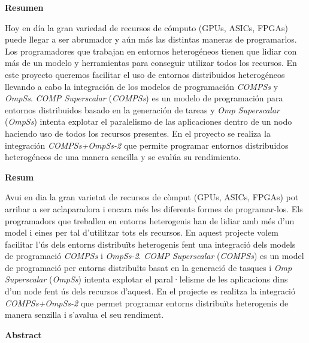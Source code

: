 \afterpage{\blankpage}
\newpage

\noindent
\thispagestyle{plain}
\begin{center}
	\huge{\textbf{Resumen}}
\end{center}

Hoy en día la gran variedad de recursos de cómputo (GPUs, ASICs, FPGAs) puede llegar a ser abrumador y aún más las distintas maneras de programarlos. 
Los programadores que trabajan en entornos heterogéneos tienen que lidiar con más de un modelo y herramientas para conseguir utilizar todos los recursos.
En este proyecto queremos facilitar el uso de entornos distribuidos heterogéneos llevando a cabo la integración de los modelos de programación \textit{COMPSs} y \textit{OmpSs}. \textit{COMP Superscalar} (\textit{COMPSs}) es un modelo de programación para entornos distribuidos basado en la generación de tareas y \textit{Omp Superscalar} (\textit{OmpSs}) intenta explotar el paralelismo de las aplicaciones dentro de un nodo haciendo uso de todos los recursos presentes.
En el proyecto se realiza la integración \textit{COMPSs+OmpSs-2} que permite programar entornos distribuidos heterogéneos de una manera sencilla y se evalúa su rendimiento.

\afterpage{\blankpage}
\newpage

\noindent
\thispagestyle{plain}
\begin{center}
	\huge{\textbf{Resum}}
\end{center}

Avui en dia la gran varietat de recursos de còmput (GPUs, ASICs, FPGAs) pot arribar a ser aclaparadora i encara més les diferents formes de programar-los.
Els programadors que treballen en entorns heterogenis han de lidiar amb més d'un model i eines per tal d'utilitzar tots els recursos. En aquest projecte volem facilitar l'ús dels entorns distribuïts heterogenis fent una integració dels models de programació \textit{COMPSs} i \textit{OmpSs-2}. \textit{COMP Superscalar} (\textit{COMPSs}) es un model de programació per entorns distribuïts basat en la generació de tasques i \textit{Omp Superscalar} (\textit{OmpSs}) intenta explotar el paral·lelisme de les aplicacions dins d'un node fent ús dels recursos d'aquest. En el projecte es realitza la integració \textit{COMPSs+OmpSs-2} que permet programar entorns distribuïts heterogenis de manera senzilla i s'avalua el seu rendiment.

\afterpage{\blankpage}
\newpage

\noindent
\thispagestyle{plain}
\begin{center}
	\huge{\textbf{Abstract}}
\end{center}

